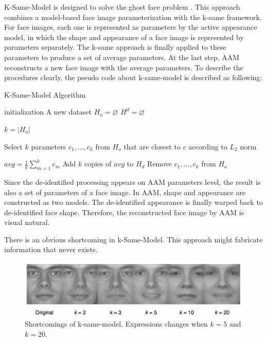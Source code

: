	K-Same-Model is designed to solve the ghost face problem \cite{Gross08}. 
	This approach combines a model-based face image parameterization with the
	k-same framework. For face images, each one is represented as parameters 
	by the active appearance model, in which the shape and appearance of a 
	face image is represented by parameters separately. The k-same approach 
	is finally applied to these parameters to produce a set of average parameters. 
	At the last step, AAM reconstructs a new face image with the average parameters.
	To describe the procedures clearly, the pseudo code about k-same-model 
	is described as following:
	
	\begin{algorithm}[H]  
	\caption{K-Same-Model Algorithm}  
	initialization\;
	A new dataset $H_o = \varnothing$ \;
	$H^d = \varnothing$ \;
	{
		{
			$k = |H_o|$\;
		}

		Select $k$ parameters ${c_1,...,c_k}$ from $H_o$ that are closest 
		to $c$ according to $L_2$ norm\;
		
		$avg = \frac{1}{k}\sum^{k}_{m=1}c_m$\;
		Add $k$ copies of $avg$ to $H_d$\;
		Remove ${c_1,...,c_k}$ from $H_o$\;
	}
	\end{algorithm}

	Since the de-identified processing appears on AAM parameters level, 
	the result is also a set of parameters of a face image. In AAM, shape
	and appearance are constructed as two models. The de-identified
	appearance is finally warped back to de-identified face shape. Therefore,
	the reconstructed face image by AAM is visual natural. 

  	There is an obvious shortcoming in k-Same-Model. This approach might
  	fabricate information that never exists. 

	\begin{figure}[!htb]
	    \centering
	    \includegraphics[scale=0.51]{figure/kSameSele}
	    \caption{Shortcomings of k-same-model. Expressions changes when $k=5$
	    	and $k=20$.}
	    \label{fig:kSameSelect}
  	\end{figure}
  	
